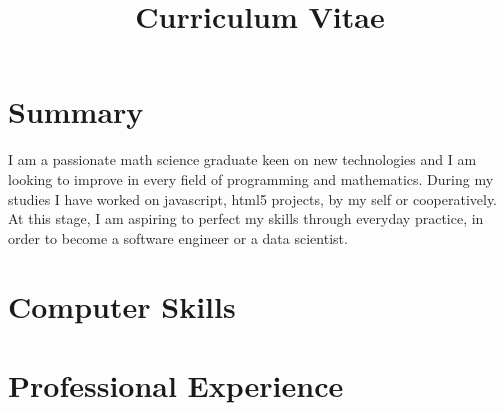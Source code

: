 \documentclass[11pt,a4paper,sans]{moderncv}
\title{Curriculum Vitae}
\begin{document}
\makecvtitle


\section{Summary}
\opening{ }
I am a passionate math science graduate keen on new technologies 
and I am looking to improve in every field of programming and mathematics. 
During my studies I have worked on javascript, html5 projects, by my self 
or cooperatively. At this stage, I am aspiring to perfect my skills through everyday practice, 
in order to become a software engineer or a data scientist. 


\section{Computer Skills}
\section{Professional Experience}
\end{document}
